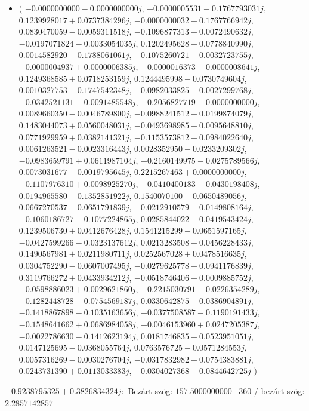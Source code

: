 \documentclass[14pt,a4paper]{article}
\begin{document}
\begin{itemize}
\item
$\big($
$-0.0000000000-0.0000000000j$, $-0.0000005531-0.1767793031j$, $0.1239928017+0.0737384296j$, $-0.0000000032-0.1767766942j$, $0.0830470059-0.0059311518j$, $-0.1096877313-0.0072490632j$, $-0.0197071824-0.0033054035j$, $0.1202495628-0.0778840990j$, $0.0014582920-0.1788061061j$, $-0.1075260721-0.0032723755j$, $-0.0000004937+0.0000006385j$, $-0.0000016373-0.0000008641j$, $0.1249368585+0.0718253159j$, $0.1244495998-0.0730749604j$, $0.0010327753-0.1747542348j$, $-0.0982033825-0.0027299768j$, $-0.0342521131-0.0091485548j$, $-0.2056827719-0.0000000000j$, $0.0089660350-0.0046789800j$, $-0.0988241512+0.0199874079j$, $0.1483044073+0.0560048031j$, $-0.0493698985-0.0095648810j$, $0.0771929959+0.0382141321j$, $-0.1153573812+0.0984022640j$, $0.0061263521-0.0023316443j$, $0.0028352950-0.0233209302j$, $-0.0983659791+0.0611987104j$, $-0.2160149975-0.0275789566j$, $0.0073031677-0.0019795645j$, $0.2215267463+0.0000000000j$, $-0.1107976310+0.0098925270j$, $-0.0410400183-0.0430198408j$, $0.0194965580-0.1352851922j$, $0.1540070100-0.0650489056j$, $0.0667270537-0.0651791839j$, $-0.0212910579-0.0149808164j$, $-0.1060186727-0.1077224865j$, $0.0285844022-0.0419543424j$, $0.1239506730+0.0412676428j$, $0.1541215299-0.0651597165j$, $-0.0427599266-0.0323137612j$, $0.0213283508+0.0456228433j$, $0.1490567981+0.0211980711j$, $0.0252567028+0.0478516635j$, $0.0304752290-0.0607007495j$, $-0.0279625778-0.0941176839j$, $0.3119766272+0.0433934212j$, $-0.0518746406-0.0009885752j$, $-0.0598886023+0.0029621860j$, $-0.2215030791-0.0226354289j$, $-0.1282448728-0.0754569187j$, $0.0330642875+0.0386904891j$, $-0.1418867898-0.1035163656j$, $-0.0377508587-0.1190191433j$, $-0.1548641662+0.0686984058j$, $-0.0046153960+0.0247205387j$, $-0.0022786630-0.1412623194j$, $0.0181746835+0.0523951051j$, $0.0147125695-0.0368055764j$, $0.0763576725-0.0571284553j$, $0.0057316269-0.0030276704j$, $-0.0317832982-0.0754383881j$, $0.0243731390+0.0113033383j$, $-0.0304027368+0.0844642725j$
$\big)$
\end{itemize}
$-0.9238795325+0.3826834324j$:\
Bezárt szög: $157.5000000000$ \
360 / bezárt szög: $2.2857142857$\
\end{document}
